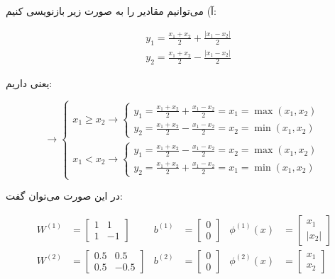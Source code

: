 
آ) می‌توانیم مقادیر  را به صورت زیر بازنویسی کنیم:

\begin{align*}
& y_1 = \frac{x_1+x_2}{2} + \frac{|x_1-x_2|}{2} \\
& y_2 = \frac{x_1+x_2}{2} - \frac{|x_1-x_2|}{2}
\end{align*}

یعنی داریم:

$$
\rightarrow \begin{cases}
x_1 \ge x_2 \rightarrow \begin{cases} y_1 =  \frac{x_1+x_2}{2} + \frac{x_1-x_2}{2} = x_1 = \max(x_1, x_2) \\
y_2 = \frac{x_1+x_2}{2} - \frac{x_1 - x_2}{2} = x_2 = \min(x_1, x_2) \end{cases}\\

x_1 < x_2 \rightarrow \begin{cases} y_1 =  \frac{x_1+x_2}{2} - \frac{x_1-x_2}{2} = x_2 = \max(x_1, x_2) \\
y_2 = \frac{x_1+x_2}{2} + \frac{x_1 - x_2}{2} = x_1 = \min(x_1, x_2) \end{cases}
\end{cases}$$

در این صورت می‌توان گفت:

\begin{align*}
W^{(1)} &= \begin{bmatrix}1 & 1 \\ 1 & -1\end{bmatrix}
& b^{(1)} &= \begin{bmatrix}0 \\ 0\end{bmatrix}
& \phi^{(1)}(x) &= \begin{bmatrix}x_1 \\ |x_2|\end{bmatrix} \\
W^{(2)} &= \begin{bmatrix} 0.5 & 0.5 \\ 0.5 & -0.5\end{bmatrix}
&b^{(2)} &= \begin{bmatrix}0 \\ 0\end{bmatrix}
&\phi^{(2)}(x) &= \begin{bmatrix}x_1 \\ x_2\end{bmatrix}
\end{align*}

